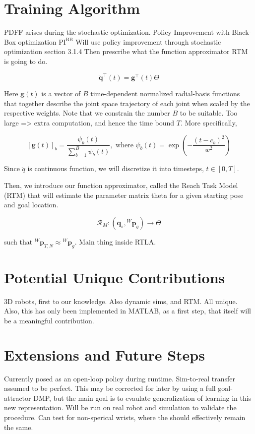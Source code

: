 \documentclass[10pt]{article}
\begin{document}
\section{Training Algorithm}
\label{sec:training_algo}
PDFF arises during the stochastic optimization. Policy  Improvement with   Black-Box optimization $\text{PI}^{\text{BB}}$
Will use policy improvement through stochastic optimization \cite{pdff} section 3.1.4
Then prescribe what the function approximator RTM is going to do.

\begin{equation}
\label{eqn:dmp_theta_to_qdd}
        \ddot{\mathbf{q}}^\intercal(t) = \mathbf{g}^\intercal(t)\Theta
\end{equation}

Here $\mathbf{g}(t)$ is a vector of $B$ time-dependent normalized radial-basis functions that together describe the joint space trajectory of each joint when scaled by the respective weights. Note that we constrain the number $B$ to be suitable. Too large => extra computation, and hence the time bound $T$. More specifically,

\begin{equation}
\label{eqn:dmp_radial_basis}
    [\mathbf{g}(t)]_b = \frac{\psi_b(t)}{\sum_{b=1}^{B} \psi_b(t)}, \text{ where } \psi_b(t) = \exp{\left(-\frac{(t-c_b)^2}{w^2}\right)}
\end{equation}

Since $\ddot{q}$ is continuous function, we will discretize it into timesteps, $t \in [0, T]$.

Then, we introduce our function approximator, called the Reach Task Model (RTM) that will estimate the parameter matrix theta for a given starting pose and goal location.

\begin{equation}
    \mathcal{R}_M: (\mathbf{q}_s, {^W}\mathbf{p}_{g}) \rightarrow \Theta
\end{equation}

such that ${^W}\mathbf{p}_{T,N} \approx {^W}\mathbf{p}_{g}$. Main thing inside RTLA.

\section{Potential Unique Contributions}
3D robots, first to our knowledge. Also dynamic sims, and RTM. All unique. Also, this has only been implemented in MATLAB, as a first step, that itself will be a meaningful contribution.

\section{Extensions and Future Steps}
Currently posed as an open-loop policy during runtime. Sim-to-real transfer assumed to be perfect. This may be corrected for later by using a full goal-attractor DMP, but the main goal is to evaulate generalization of learning in this new representation. Will be run on real robot and simulation to validate the procedure. Can test for non-sperical wrists, where the should effectively remain the same.
\end{document}
